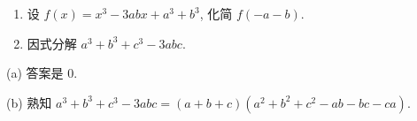 \begin{prob}
\label{prob:prob-12}
\begin{enumerate}[label={\normalfont(\alph*)}]
\item 设 $f(x) = x^3 - 3abx + a^3 + b^3$, 化简 $f(-a-b)$.
\item 因式分解 $a^3 + b^3 + c^3 - 3abc$.
\end{enumerate}
\end{prob}

\begin{soln}
(a) 答案是 $\boxed{0.}$

\bigskip

(b) 熟知 $\boxed{a^3 + b^3 + c^3 - 3abc = (a+b+c)(a^2+b^2+c^2-ab-bc-ca).}$
\end{soln}
